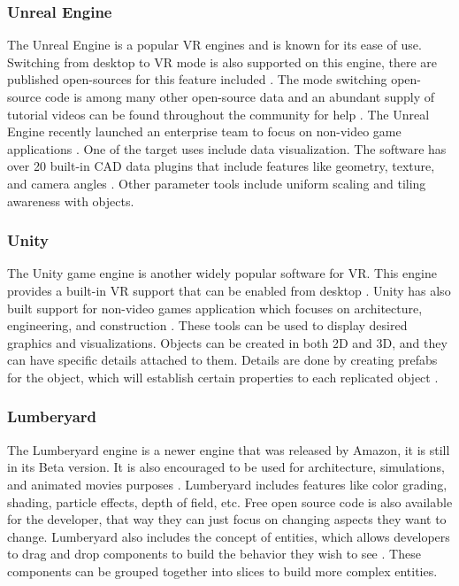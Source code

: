 \documentclass[onecolumn, draftclsnofoot,10pt, compsoc]{IEEEtran}
\begin{document}
\subsubsection{Unreal Engine}
\begin{singlespace}
The Unreal Engine is a popular VR engines and is known for its ease of use. Switching from desktop to VR mode is also supported on this engine, there are published open-sources for this feature included \cite{UE4 forum}. The mode switching open-source code is among many other open-source data and an abundant supply of tutorial videos can be found throughout the community for help \cite{UE4 EG}. The Unreal Engine recently launched an enterprise team to focus on non-video game applications \cite{UE4E QA}. One of the target uses include data visualization. The software has over 20 built-in CAD data plugins that include features like geometry, texture, and camera angles \cite{UE4E GFX}. Other parameter tools include uniform scaling and tiling awareness with objects. 

\end{singlespace}

\subsubsection{Unity}
\begin{singlespace}
The Unity game engine is another widely popular software for VR. This engine provides a built-in VR support that can be enabled from desktop \cite{unity3d}. Unity has also built support for non-video games application which focuses on architecture, engineering, and construction \cite{unity AEC}. These tools can be used to display desired graphics and visualizations. Objects can be created in both 2D and 3D, and they can have specific details attached to them. Details are done by creating prefabs for the object, which will establish certain properties to each replicated object \cite{unity3d}.  
 
\end{singlespace}

\subsubsection{Lumberyard}
\begin{singlespace}
The Lumberyard engine is a newer engine that was released by Amazon, it is still in its Beta version. It is also encouraged to be used for architecture, simulations, and animated movies purposes \cite{lumberyard}. Lumberyard includes features like color grading, shading, particle effects, depth of field, etc. Free open source code is also available for the developer, that way they can just focus on changing aspects they want to change. Lumberyard also includes the concept of entities, which allows developers to drag and drop components to build the behavior they wish to see \cite{lumberyard}. These components can be grouped together into slices to build more complex entities.  
\end{singlespace}
\end{document}
